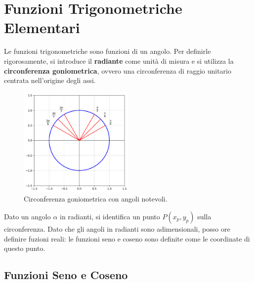   \section{Funzioni Trigonometriche Elementari}
Le funzioni trigonometriche sono funzioni di un angolo. Per definirle rigorosamente, si introduce il \textbf{radiante} come unità di misura e si utilizza la \textbf{circonferenza goniometrica}, ovvero una circonferenza di raggio unitario centrata nell'origine degli assi.

\begin{figure}[H]
    \centering
    \includegraphics[width=0.5\textwidth]{./img/circonferenza_goniometrica.png}
    \caption{Circonferenza goniometrica con angoli notevoli.}
    \label{fig:circonferenza_goniometrica}
\end{figure}
\FloatBarrier

Dato un angolo \(\alpha\) in radianti, si identifica un punto \(P(x_p, y_p)\) sulla circonferenza. Dato che gli angoli in radianti sono adimensionali, posso ore definire fuzioni reali: le funzioni seno e coseno sono definite come le coordinate di questo punto.


\subsection{Funzioni Seno e Coseno}

